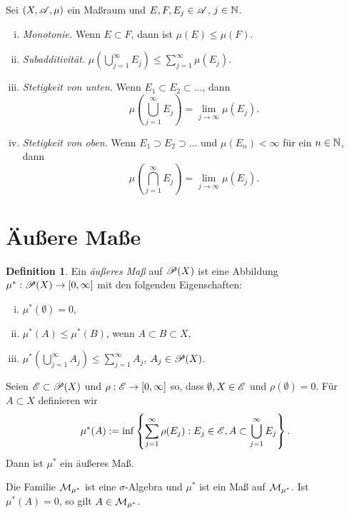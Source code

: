 \documentclass[
 a4paper,
 10pt,
 parskip=half
 ]{scrartcl}
\theoremstyle{plain}
\theoremstyle{definition}
\newtheorem*{defn}{Definition}
\numberwithin{equation}{section}
\begin{document}
\begin{thm}
 Sei $(X, \mathscr{A}, \mu)$ ein Maßraum und $E, F, E_j \in \mathscr{A}$, $j \in \mathbb{N}$. 
 \begin{enumerate}[(i)]
  \item \emph{Monotonie.} Wenn $E \subset F$, dann ist $\mu(E) \le \mu(F)$.
  \item \emph{Subadditivität.} $\mu \left( \bigcup_{j=1}^\infty E_j \right) \le \sum_{j=1}^\infty \mu(E_j)$.
  \item \emph{Stetigkeit von unten.} Wenn $E_1 \subset E_2 \subset \ldots$, dann
   \[ \mu \left( \bigcup_{j=1}^\infty E_j \right) = \lim_{j \to \infty} \mu( E_j ).  \]
  \item \emph{Stetigkeit von oben.} Wenn $E_1 \supset E_2 \supset \ldots$ und $\mu(E_n) < \infty$ für ein $n \in \mathbb{N}$, dann
   \[ \mu \left( \bigcap_{j=1}^\infty E_j \right) = \lim_{j \to \infty} \mu( E_j ).  \]
 \end{enumerate}
\end{thm}

\section*{Äußere Maße}
\begin{defn}
 Ein \emph{äußeres Maß} auf $\mathscr{P}(X)$ ist eine Abbildung $\mu^* : \mathscr{P}(X) \to [0,\infty]$ mit den folgenden Eigenschaften:
 \begin{enumerate}[(i)]
  \item $\mu^*(\emptyset) = 0$,
  \item $\mu^*( A ) \le \mu^*(B)$, wenn $A \subset B \subset X$,
  \item $\mu^*( \bigcup_{j=1}^\infty A_j ) \le \sum_{j=1}^\infty A_j$, $A_j \in \mathscr{P}(X)$.
 \end{enumerate}
\end{defn}

\begin{lem}
 Seien $\mathscr{E} \subset \mathscr{P}(X)$ und $\rho: \mathscr{E} \to [0, \infty]$ so, dass $\emptyset, X \in \mathscr{E}$ und $\rho(\emptyset) = 0$. Für $A \subset X$ definieren wir
 \[ \mu^*(A) := \inf \left\{ \sum_{j=1}^\infty \rho(E_j) : E_j \in \mathscr{E}, A \subset \bigcup_{j=1}^\infty E_j \right\}. \]
 Dann ist $\mu^*$ ein äußeres Maß.
\end{lem}

\begin{thm}[Caratheodory]
 Die Familie $\mathcal{M}_{\mu^*}$ ist eine $\sigma$-Algebra und $\mu^*$ ist ein Maß
 auf $\mathcal{M}_{\mu^*}$. Ist $\mu^*(A) = 0$, so gilt $A \in \mathcal{M}_{\mu^*}$.
\end{thm}
\end{document}
